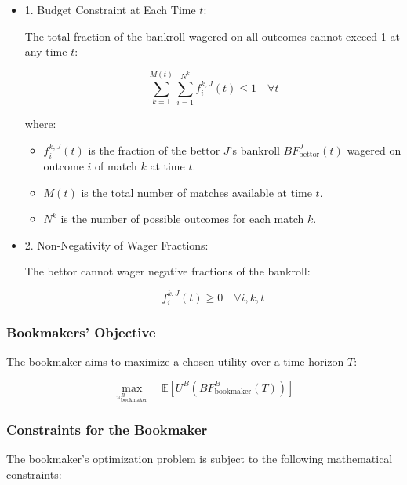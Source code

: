 \begin{itemize}
    \item 1. Budget Constraint at Each Time \( t \):

   The total fraction of the bankroll wagered on all outcomes cannot exceed 1 at any time \( t \):

   \[
   \sum_{k=1}^{M(t)} \sum_{i=1}^{N^k} f_i^{k,J}(t) \leq 1 \quad \forall t
   \]

   where:
   \begin{itemize}
       \item \( f_i^{k,J}(t) \) is the fraction of the bettor \( J \)'s bankroll \( BF_{\text{bettor}}^J(t) \) wagered on outcome \( i \) of match \( k \) at time \( t \).
       \item \( M(t) \) is the total number of matches available at time \( t \).
       \item \( N^k \) is the number of possible outcomes for each match \(k\).
   \end{itemize}


\item 2. Non-Negativity of Wager Fractions:

   The bettor cannot wager negative fractions of the bankroll:

   \[
   f_i^{k,J}(t) \geq 0 \quad \forall i, k, t
   \]
\end{itemize}



\subsubsection{Bookmakers' Objective}

The bookmaker aims to maximize a chosen utility over a time horizon \( T \):

\[
\max_{\pi_{\text{bookmaker}}^B} \quad \mathbb{E} \left[ U^{B} \left( BF_{\text{bookmaker}}^B(T) \right) \right]
\]


\subsubsection{Constraints for the Bookmaker}

The bookmaker's optimization problem is subject to the following mathematical constraints:

